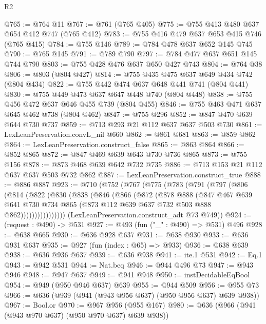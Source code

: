 \begin{lexlean}{R2}
\begin{coremodule}
@765 := @764 @11
@767 := @761 (@765 @405)
@775 := @755 @413 @480 @637 @654 @412 @747 (@765 @412)
@783 := @755 @416 @479 @637 @653 @415 @746 (@765 @415)
@784 := @755 @146
@789 := @784 @478 @637 @652 @145 @745
@790 := @765 @145
@791 := @789 @790
@797 := @784 @477 @637 @651 @145 @744 @790
@803 := @755 @428 @476 @637 @650 @427 @743
@804 := @764 @38
@806 := @803 (@804 @427)
@814 := @755 @435 @475 @637 @649 @434 @742 (@804 @434)
@822 := @755 @442 @474 @637 @648 @441 @741 (@804 @441)
@830 := @755 @449 @473 @637 @647 @448 @740 (@804 @448)
@838 := @755 @456 @472 @637 @646 @455 @739 (@804 @455)
@846 := @755 @463 @471 @637 @645 @462 @738 (@804 @462)
@847 := @755 @296
@852 := @847 @470 @639 @644 @730 @737
@859 := @713 @293 @21 @112 @637 @637 @503 @730
@861 := LexLeanPreservation.convL_nil @660
@862 := @861 @681
@863 := @859 @862
@864 := LexLeanPreservation.construct_false
@865 := @863 @864
@866 := @852 @865
@872 := @847 @469 @639 @643 @730 @736 @865
@873 := @755 @156
@878 := @873 @468 @639 @642 @732 @735
@886 := @713 @153 @21 @112 @637 @637 @503 @732 @862
@887 := LexLeanPreservation.construct_true
@888 := @886 @887
@923 := @710
    (@752
      (@767
        (@775
          (@783
            (@791
              (@797
                (@806
                  (@814
                    (@822
                      (@830
                        (@838
                          (@846
                            (@866
                              (@872
                                (@878
                                  @888
                                  (@847
                                    @467
                                    @639
                                    @641
                                    @730
                                    @734
                                    @865
                                    (@873 @112 @639 @637 @732 @503 @888 @862))))))))))))))))
      (LexLeanPreservation.construct_adt @73 @749))
@924 := (request : @490) -> @531
@927 := @493 (fun ("_" : @490) => @531) @496
@928 := @638 @665
@930 := @636 @928 @637
@931 := @638 @930
@933 := @636 @931 @637
@935 := @927 (fun (index : @65) => @933)
@936 := @638 @639
@938 := @636 @936 @637
@939 := @636 @938
@941 := ite.{1} @531
@942 := Eq.{1}
@943 := @942 @531
@944 := Nat.beq
@946 := @944 @496 @73
@947 := @943 @946
@948 := @947 @637
@949 := @941 @948
@950 := instDecidableEqBool
@954 := @949 (@950 @946 @637) @639
@955 := @944 @509
@956 := @955 @73
@966 := @636 (@939 (@941 (@943 @956 @637) (@950 @956 @637) @639 @938))
@967 := Bool.or
@970 := @967 @956 (@955 @167)
@980 := @636 (@966 (@941 (@943 @970 @637) (@950 @970 @637) @639 @938))

\end{coremodule}
\end{lexlean}
